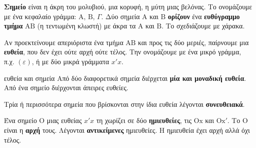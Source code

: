 

\textbf{Σημείο} είναι η άκρη του μολυβιού, μια κορυφή, η μύτη μιας βελόνας. Το ονομάζουμε με ένα κεφαλαίο γράμμα: $\mathrm{Α}$, $\mathrm{Β}$, $\Gamma$. Δύο σημεία $\mathrm{Α}$ και $\mathrm{Β}$ \textbf{ορίζουν} ένα \textbf{ευθύγραμμο τμήμα} $\mathrm{ΑΒ}$ (η τεντωμένη κλωστή) με άκρα τα $\mathrm{Α}$ και $\mathrm{Β}$. Το σχεδιάζουμε με χάρακα.

Αν προεκτείνουμε απεριόριστα ένα τμήμα $\mathrm{ΑΒ}$ και προς τις δύο μεριές, παίρνουμε μια \textbf{ευθεία}, που δεν έχει ούτε αρχή ούτε τέλος. Την ονομάζουμε με ένα μικρό γράμμα, π.χ. $(\varepsilon)$, ή με δύο μικρά γράμματα $x'x$.

\begin{center}
\end{center}

\begin{idiotita}{ευθεία και σημεία}
Από δύο διαφορετικά σημεία διέρχεται \textbf{μία και μοναδική ευθεία}. Από ένα σημείο διέρχονται άπειρες ευθείες.
\end{idiotita}

Τρία ή περισσότερα σημεία που βρίσκονται στην ίδια ευθεία λέγονται \textbf{συνευθειακά}.


Ένα σημείο $\mathrm{Ο}$ μιας ευθείας $x'x$ τη χωρίζει σε δύο \textbf{ημιευθείες}, τις $\mathrm{Οx}$ και $\mathrm{Οx'}$. Το $\mathrm{Ο}$ είναι η \textbf{αρχή} τους. Λέγονται \textbf{αντικείμενες} ημιευθείες. Η ημιευθεία έχει αρχή αλλά όχι τέλος.

